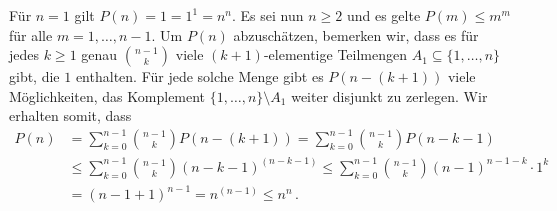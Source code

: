 Für $n = 1$ gilt $P(n) = 1 = 1^1 = n^n$.
Es sei nun $n \geq 2$ und es gelte $P(m) \leq m^m$ für alle $m = 1, \dotsc, n-1$.
Um $P(n)$ abzuschätzen, bemerken wir, dass es für jedes $k \geq 1$ genau $\binom{n-1}{k}$ viele $(k+1)$-elementige Teilmengen $A_1 \subseteq \{1, \dotsc, n\}$ gibt, die $1$ enthalten.
Für jede solche Menge gibt es $P(n-(k+1))$ viele Möglichkeiten, das Komplement $\{1, \dotsc, n\} \setminus A_1$ weiter disjunkt zu zerlegen.
Wir erhalten somit, dass
\begin{align*}
        P(n)
  &=    \sum_{k=0}^{n-1} \binom{n-1}{k} P(n-(k+1))
   =    \sum_{k=0}^{n-1} \binom{n-1}{k} P(n-k-1)
  \\
  &\leq \sum_{k=0}^{n-1} \binom{n-1}{k} (n-k-1)^{(n-k-1)}
   \leq \sum_{k=0}^{n-1} \binom{n-1}{k} (n-1)^{n-1-k} \cdot 1^k
  \\
  &=    (n-1 + 1)^{n-1}
   =   n^{(n-1)}
   \leq  n^n \,.
\end{align*}

